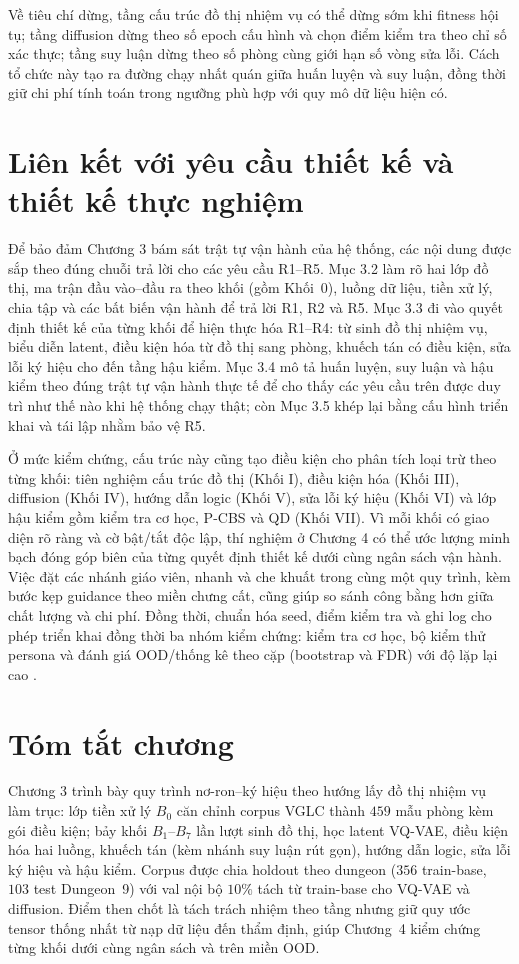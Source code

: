 \documentclass[oneside,a4paper,12pt]{extreport}
\begin{document}
Về tiêu chí dừng, tầng cấu trúc đồ thị nhiệm vụ có thể dừng sớm khi fitness hội tụ; tầng diffusion dừng theo số epoch cấu hình và chọn điểm kiểm tra theo chỉ số xác thực; tầng suy luận dừng theo số phòng cùng giới hạn số vòng sửa lỗi. Cách tổ chức này tạo ra đường chạy nhất quán giữa huấn luyện và suy luận, đồng thời giữ chi phí tính toán trong ngưỡng phù hợp với quy mô dữ liệu hiện có.

\section{Liên kết với yêu cầu thiết kế và thiết kế thực nghiệm}
Để bảo đảm Chương 3 bám sát trật tự vận hành của hệ thống, các nội dung được sắp theo đúng chuỗi trả lời cho các yêu cầu R1--R5. Mục 3.2 làm rõ hai lớp đồ thị, ma trận đầu vào--đầu ra theo khối (gồm Khối~0), luồng dữ liệu, tiền xử lý, chia tập và các bất biến vận hành để trả lời R1, R2 và R5. Mục 3.3 đi vào quyết định thiết kế của từng khối để hiện thực hóa R1--R4: từ sinh đồ thị nhiệm vụ, biểu diễn latent, điều kiện hóa từ đồ thị sang phòng, khuếch tán có điều kiện, sửa lỗi ký hiệu cho đến tầng hậu kiểm. Mục 3.4 mô tả huấn luyện, suy luận và hậu kiểm theo đúng trật tự vận hành thực tế để cho thấy các yêu cầu trên được duy trì như thế nào khi hệ thống chạy thật; còn Mục 3.5 khép lại bằng cấu hình triển khai và tái lập nhằm bảo vệ R5.

Ở mức kiểm chứng, cấu trúc này cũng tạo điều kiện cho phân tích loại trừ theo từng khối: tiên nghiệm cấu trúc đồ thị (Khối I), điều kiện hóa (Khối III), diffusion (Khối IV), hướng dẫn logic (Khối V), sửa lỗi ký hiệu (Khối VI) và lớp hậu kiểm gồm kiểm tra cơ học, P-CBS và QD (Khối VII). Vì mỗi khối có giao diện rõ ràng và cờ bật/tắt độc lập, thí nghiệm ở Chương 4 có thể ước lượng minh bạch đóng góp biên của từng quyết định thiết kế dưới cùng ngân sách vận hành. Việc đặt các nhánh giáo viên, nhanh và che khuất trong cùng một quy trình, kèm bước kẹp guidance theo miền chưng cất, cũng giúp so sánh công bằng hơn giữa chất lượng và chi phí. Đồng thời, chuẩn hóa seed, điểm kiểm tra và ghi log cho phép triển khai đồng thời ba nhóm kiểm chứng: kiểm tra cơ học, bộ kiểm thử persona và đánh giá OOD/thống kê theo cặp (bootstrap và FDR) với độ lặp lại cao \cite{efron1994bootstrap,benjamini1995fdr}.

\section{Tóm tắt chương}
Chương 3 trình bày quy trình nơ-ron--ký hiệu theo hướng lấy đồ thị nhiệm vụ làm trục: lớp tiền xử lý $B_0$ căn chỉnh corpus VGLC thành $459$ mẫu phòng kèm gói điều kiện; bảy khối $B_1$--$B_7$ lần lượt sinh đồ thị, học latent VQ-VAE, điều kiện hóa hai luồng, khuếch tán (kèm nhánh suy luận rút gọn), hướng dẫn logic, sửa lỗi ký hiệu và hậu kiểm. Corpus được chia holdout theo dungeon ($356$ train-base, $103$ test Dungeon~9) với val nội bộ $10\%$ tách từ train-base cho VQ-VAE và diffusion. Điểm then chốt là tách trách nhiệm theo tầng nhưng giữ quy ước tensor thống nhất từ nạp dữ liệu đến thẩm định, giúp Chương~4 kiểm chứng từng khối dưới cùng ngân sách và trên miền OOD.
\end{document}
